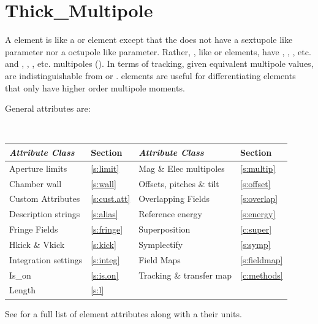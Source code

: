 {\section{Thick_Multipole}
\label{s:thick.mult}

A  element is like a  or  element except that the
 does not have a  sextupole like parameter nor a  octupole like
parameter. Rather, , like  or  elements, have
, , , etc.  and , , , etc. multipoles
(). In terms of tracking, given equivalent multipole values, 
are indistinguishable from  or .   elements are
useful for differentiating elements that only have higher order multipole moments.

General  attributes are:
\begin{center}
\tt
\begin{tabular}{llll} \toprule
  {\sl Attribute Class}      & Section             & {\sl Attribute Class}      & Section            \\ \midrule
  Aperture limits            & \ref{s:limit}       & Mag \& Elec multipoles     & \ref{s:multip}     \\
  Chamber wall               & \ref{s:wall}        & Offsets, pitches \& tilt   & \ref{s:offset}     \\
  Custom Attributes          & \ref{s:cust.att}    & Overlapping Fields         & \ref{s:overlap}    \\
  Description strings        & \ref{s:alias}       & Reference energy           & \ref{s:energy}     \\ 
  Fringe Fields              & \ref{s:fringe}      & Superposition              & \ref{c:super}      \\
  Hkick \& Vkick             & \ref{s:kick}        & Symplectify                & \ref{s:symp}       \\
  Integration settings       & \ref{s:integ}       & Field Maps                 & \ref{s:fieldmap}   \\
  Is_on                      & \ref{s:is.on}       & Tracking \& transfer map   & \ref{c:methods}    \\ 
  Length                     & \ref{s:l}           &                            &                    \\
  \bottomrule
\end{tabular}
\end{center}
\toffset
See  for a full list of element attributes along with a their units.

}
